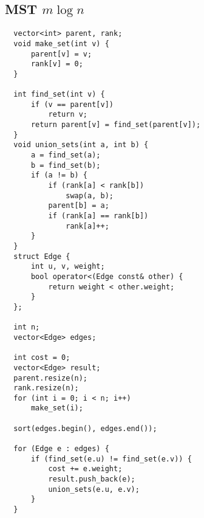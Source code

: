 \documentclass{article}
\begin{document}
\subsection{MST $m\log n$}
\begin{lstlisting}
  vector<int> parent, rank;
  void make_set(int v) {
      parent[v] = v;
      rank[v] = 0;
  }

  int find_set(int v) {
      if (v == parent[v])
          return v;
      return parent[v] = find_set(parent[v]);
  }
  void union_sets(int a, int b) {
      a = find_set(a);
      b = find_set(b);
      if (a != b) {
          if (rank[a] < rank[b])
              swap(a, b);
          parent[b] = a;
          if (rank[a] == rank[b])
              rank[a]++;
      }
  }
  struct Edge {
      int u, v, weight;
      bool operator<(Edge const& other) {
          return weight < other.weight;
      }
  };

  int n;
  vector<Edge> edges;

  int cost = 0;
  vector<Edge> result;
  parent.resize(n);
  rank.resize(n);
  for (int i = 0; i < n; i++)
      make_set(i);

  sort(edges.begin(), edges.end());

  for (Edge e : edges) {
      if (find_set(e.u) != find_set(e.v)) {
          cost += e.weight;
          result.push_back(e);
          union_sets(e.u, e.v);
      }
  }
\end{lstlisting}
\end{document}
